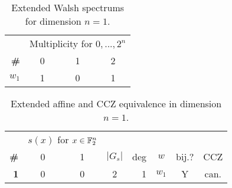 \begin{table}[H]\centering
\begin{tabular}{>{\bfseries}rccc}
\toprule
& \multicolumn{3}{c}{Multiplicity for $0, ..., 2^n$} \\
\cmidrule{2-4}
\# & 0 & 1 & 2 \\
\midrule
$w_1$ & 1 & 0 & 1 \\
 \bottomrule
\end{tabular}
\caption{Extended Walsh spectrums for dimension $n=1$.}
\label{tab:walshdim1}
\end{table}

\begin{table}[H]\centering
\begin{tabular}{>{\bfseries}rcccrccc}
\toprule
& \multicolumn{2}{c}{$s(x)$ for $x\in{\mathbb{F}}_2^n$} & \\
\cmidrule{2-3}
\# & 0 & 1 & $|G_s|$ & deg & $w$ & bij.? & CCZ \\
\midrule
1 & 0 & 0 & 2 & 1 & $w_1$ & Y & can. \\
 \bottomrule
\end{tabular}
\caption{Extended affine and CCZ equivalence in dimension $n=1$.}
\label{tab:dim1}
\end{table}
